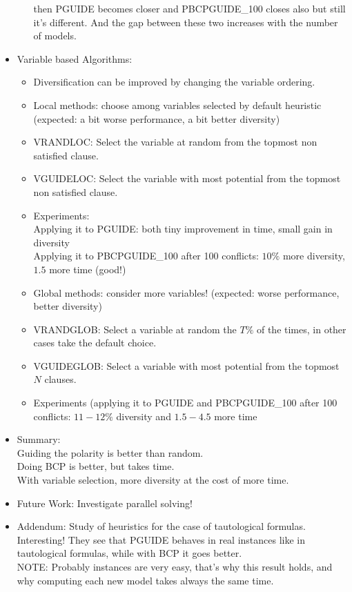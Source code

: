 \begin{itemize}
\begin{itemize}
        then PGUIDE becomes closer and PBCPGUIDE\_100 closes also but still it's different.
        And the gap between these two increases with the number of models.
    \end{itemize}
\item
    Variable based Algorithms:
    \begin{itemize}
    \item
        Diversification can be improved by changing the variable ordering.
    \item
        Local methods: choose among variables selected by default heuristic 
        (expected: a bit worse performance, a bit better diversity)
    \item
        VRANDLOC: Select the variable at random from the topmost non satisfied clause.
    \item
        VGUIDELOC: Select the variable with most potential from the topmost non satisfied clause.
    \item
        Experiments: 
        \\
        Applying it to PGUIDE: both tiny improvement in time, small gain in diversity
        \\
        Applying it to PBCPGUIDE\_100 after 100 conflicts: $10\%$ more diversity, $1.5$ more time (good!)
    \item
        Global methods: consider more variables! 
        (expected: worse performance, better diversity)
    \item
        VRANDGLOB: Select a variable at random the $T\%$ of the times, in other cases take the default choice.
    \item
        VGUIDEGLOB: Select a variable with most potential from the topmost $N$ clauses.
    \item
        Experiments (applying it to PGUIDE and PBCPGUIDE\_100 after 100 conflicts: 
        $11-12\%$ diversity and $1.5-4.5$ more time
    \end{itemize}
\item
    Summary:
    \\
    Guiding the polarity is better than random.
    \\
    Doing BCP is better, but takes time.
    \\
    With variable selection, more diversity at the cost of more time.
\item
    Future Work: Investigate parallel solving!
\item
    Addendum:
    Study of heuristics for the case of tautological formulas. Interesting!
    They see that PGUIDE behaves in real instances like in tautological formulas,
    while with BCP it goes better.
    \\
    NOTE: Probably instances are very easy, that's why this result holds, and 
    why computing each new model takes always the same time.
\end{itemize}

